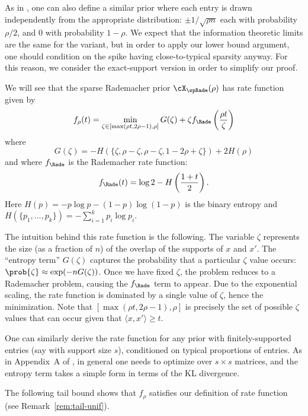 \documentclass{article}
\begin{document}
\begin{remark}
\label{rem:iid}
As in \cite{mi}, one can also define a similar \iid prior where each entry is drawn independently from the appropriate distribution: $\pm 1/\sqrt{\rho n}$ each with probability $\rho/2$, and 0 with probability $1-\rho$. We expect that the information theoretic limits are the same for the \iid variant, but in order to apply our lower bound argument, one should condition on the spike having close-to-typical sparsity anyway. For this reason, we consider the exact-support version in order to simplify our proof.
\end{remark}

We will see that the sparse Rademacher prior $\cX_\spRade(\rho)$ has rate function given by
$$f_\rho(t) = \min_{\zeta \in [\max(\rho t,2\rho-1),\rho]} G(\zeta) + \zeta f_\Rade\left(\frac{\rho t}{\zeta}\right)$$
where
$$G(\zeta) = -H(\{\zeta,\rho-\zeta,\rho-\zeta,1-2\rho+\zeta\}) + 2H(\rho)$$
and where $f_\Rade$ is the Rademacher rate function:
$$f_\Rade(t) = \log 2 - H\left(\frac{1+t}{2}\right).$$
Here $H(p) = -p \log p - (1-p)\log(1-p)$ is the binary entropy and $H(\{p_1,\ldots,p_k\}) = -\sum_{i=1}^k p_i \log p_i$.

The intuition behind this rate function is the following. The variable $\zeta$ represents the size (as a fraction of $n$) of the overlap of the supports of $x$ and $x'$. The ``entropy term'' $G(\zeta)$ captures the probability that a particular $\zeta$ value occurs: $\prob{\zeta} \approx \exp(-n G(\zeta))$. Once we have fixed $\zeta$, the problem reduces to a Rademacher problem, causing the $f_\Rade$ term to appear. Due to the exponential scaling, the rate function is dominated by a single value of $\zeta$, hence the minimization. Note that $[\max(\rho t,2\rho-1),\rho]$ is precisely the set of possible $\zeta$ values that can occur given that $\langle x,x' \rangle \ge t$.

\begin{remark}
One can similarly derive the rate function for any prior with \iid finitely-supported entries (say with support size $s$), conditioned on typical proportions of entries. As in Appendix~A of \cite{bmnn}, in general one needs to optimize over $s \times s$ matrices, and the entropy term takes a simple form in terms of the KL divergence.
\end{remark}

The following tail bound shows that $f_\rho$ satisfies our definition of rate function (see Remark~\ref{rem:tail-unif}).
\end{document}
